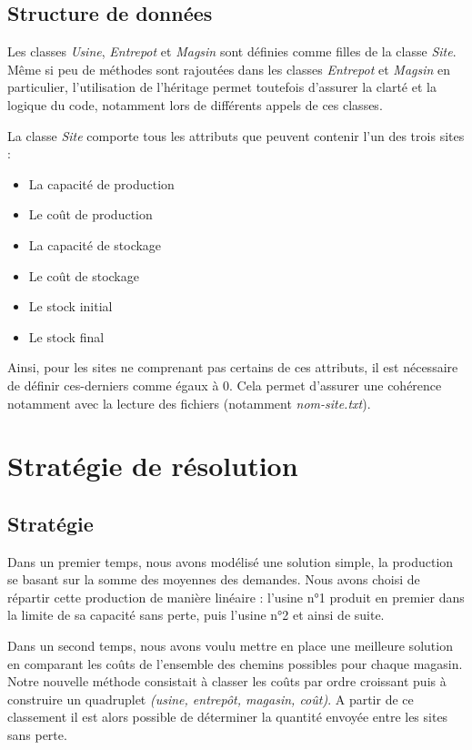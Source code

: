 \documentclass[12pt, a4paper]{article}
\begin{document}
\subsection{Structure de données}

Les classes \emph{Usine}, \emph{Entrepot} et \emph{Magsin} sont définies comme filles de la classe \emph{Site}. Même si peu de méthodes sont rajoutées dans les classes \emph{Entrepot} et \emph{Magsin} en particulier, l'utilisation de l'héritage permet toutefois d'assurer la clarté et la logique du code, notamment lors de différents appels de ces classes.

La classe \emph{Site} comporte tous les attributs que peuvent contenir l'un des trois sites :
\begin{itemize}
\item La capacité de production
\item Le coût de production
\item La capacité de stockage
\item Le coût de stockage
\item Le stock initial
\item Le stock final
\end{itemize}
Ainsi, pour les sites ne comprenant pas certains de ces attributs, il est nécessaire de définir ces-derniers comme égaux à 0. Cela permet d'assurer une cohérence notamment avec la lecture des fichiers (notamment \emph{nom-site.txt}).


\section{Stratégie de résolution}

\subsection{Stratégie}
Dans un premier temps, nous avons modélisé une solution simple, la production se basant sur la somme des moyennes des demandes. Nous avons choisi de répartir cette production de manière linéaire : l'usine n°1 produit en premier dans la limite de sa capacité sans perte, puis l'usine n°2 et ainsi de suite.

Dans un second temps, nous avons voulu mettre en place une meilleure solution en comparant les coûts de l'ensemble des chemins possibles pour chaque magasin. Notre nouvelle méthode consistait à classer les coûts par ordre croissant puis à construire un quadruplet \emph{(usine, entrepôt, magasin, coût)}. A partir de ce classement il est alors possible de déterminer la quantité envoyée entre les sites sans perte.
\end{document}
